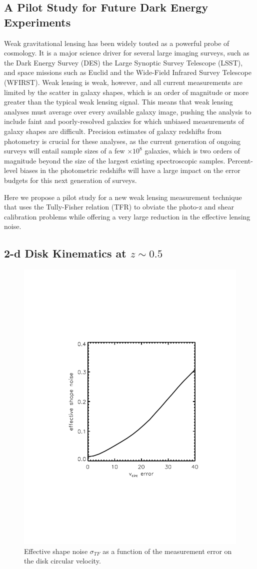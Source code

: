 \documentclass[12pt]{article}
\begin{document}
\subsection{A Pilot Study for Future Dark Energy Experiments}

Weak gravitational lensing has been widely touted as a powerful probe of cosmology. It is a major science driver for several large imaging surveys, such as the Dark Energy Survey (DES) the Large Synoptic Survey Telescope (LSST), and space missions such as Euclid and the Wide-Field Infrared Survey Telescope (WFIRST). Weak lensing is weak, however, and all current measurements are limited by the scatter in galaxy shapes, which is an order of magnitude or more greater than the typical weak lensing signal. This means that weak lensing analyses must average over every available galaxy image, pushing the analysis to include faint and poorly-resolved galaxies for which unbiased measurements of galaxy shapes are difficult. Precision estimates of galaxy redshifts from photometry is crucial for these analyses, as the current generation of ongoing surveys will entail sample sizes of a few $\times10^8$ galaxies, which is two orders of magnitude beyond the size of the largest existing spectroscopic samples. Percent-level biases in the photometric redshifts will have a large impact on the error budgets for this next generation of surveys.

Here we propose a pilot study for a new weak lensing measurement technique that uses the Tully-Fisher relation (TFR) to obviate the photo-z and shear calibration problems while offering a very large reduction in the effective lensing noise.

\subsection{2-d Disk Kinematics at $z\sim0.5$}

\begin{figure}[t]
\includegraphics[width=0.45\linewidth, bb= 150 150 550 650,clip]{Plots/vcirc_error.pdf}
\caption{Effective shape noise $\sigma_{TF}$ as a  function of the
  measurement error on the disk circular velocity.}
\label{fig:shapeNoise}
\end{figure}
\end{document}
